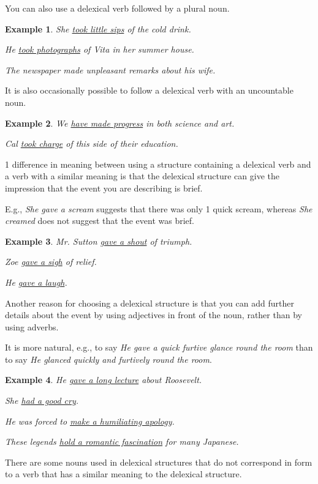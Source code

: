 \documentclass[oneside]{book}
\numberwithin{equation}{section}
\newtheorem{example}{Example}[section]
\begin{document}
%
\noindent{} You can also use a delexical verb followed by a plural noun.
\begin{example}
    She \underline{took little sips} of the cold drink.
    
    He \underline{took photographs} of Vita in her summer house.
    
    The newspaper made unpleasant remarks about his wife.
\end{example}
%
\noindent{} It is also occasionally possible to follow a delexical verb with an uncountable noun.
\begin{example}
    We \underline{have made progress} in both science and art.
    
    Cal \underline{took charge} of this side of their education.
\end{example}
%
\noindent{} 1 difference in meaning between using a structure containing a delexical verb and a verb with a similar meaning is that the delexical structure can give the impression that the event you are describing is brief.

E.g., \textit{She gave a scream} suggests that there was only 1 quick scream, whereas \textit{She creamed} does not suggest that the event was brief.
\begin{example}
    Mr. Sutton \underline{gave a shout} of triumph.
    
    Zoe \underline{gave a sigh} of relief.
    
    He \underline{gave a laugh}.
\end{example}
%
\noindent{} Another reason for choosing a delexical structure is that you can add further details about the event by using adjectives in front of the noun, rather than by using adverbs.

It is more natural, e.g., to say \textit{He gave a quick furtive glance round the room} than to say \textit{He glanced quickly and furtively round the room}.
\begin{example}
    He \underline{gave a long lecture} about Roosevelt.
    
    She \underline{had a good cry}.
    
    He was forced to \underline{make a humiliating apology}.
    
    These legends \underline{hold a romantic fascination} for many Japanese.
\end{example}
%
\noindent{} There are some nouns used in delexical structures that do not correspond in form to a verb that has a similar meaning to the delexical structure.
\end{document}
